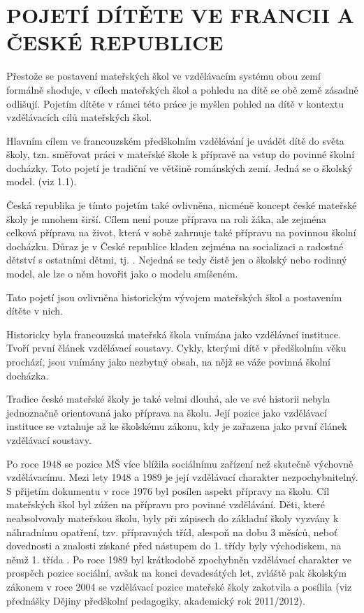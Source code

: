 \chapter{POJETÍ DÍTĚTE VE FRANCII A ČESKÉ REPUBLICE}

Přestože se postavení mateřských škol ve vzdělávacím systému obou zemí formálně shoduje, v cílech mateřských škol a pohledu na dítě se obě země zásadně odlišují. Pojetím dítěte v rámci této práce je myšlen pohled na dítě v kontextu vzdělávacích cílů mateřských škol. 

Hlavním cílem ve francouzském předškolním vzdělávání je uvádět dítě do světa školy, tzn. směřovat práci v mateřské škole k přípravě na vstup do povinné školní docházky. Toto pojetí je tradiční ve většině románských zemí. Jedná se o školský model. (viz 1.1).

 Česká republika je tímto pojetím také ovlivněna, nicméně koncept české mateřské školy je mnohem širší. Cílem není pouze příprava na roli žáka, ale zejména celková příprava na život, která v sobě zahrnuje také přípravu na povinnou školní docházku. Důraz je v České republice kladen zejména na socializaci a radostné dětství s ostatními dětmi, tj. . Nejedná se tedy čistě jen o školský nebo rodinný model, ale lze o něm hovořit jako o modelu smíšeném.

Tato pojetí jsou ovlivněna historickým vývojem mateřských škol a postavením dítěte v nich.

Historicky byla francouzská mateřská škola vnímána jako vzdělávací instituce. Tvoří první článek vzdělávací soustavy. Cykly, kterými dítě v předškolním věku prochází, jsou vnímány jako nezbytný obsah, na nějž se váže povinná školní docházka. 

Tradice české mateřské školy je také velmi dlouhá, ale ve své historii nebyla jednoznačně orientovaná jako příprava na školu. Její pozice jako vzdělávací instituce se vztahuje až ke školskému zákonu, kdy je zařazena jako první článek vzdělávací soustavy. 

 Po roce 1948 se pozice MŠ více blížila sociálnímu zařízení než skutečně výchovně vzdělávacímu. Mezi lety 1948 a 1989 je její vzdělávací charakter nezpochybnitelný. S přijetím dokumentu  v roce 1976 byl posílen aspekt přípravy na školu. Cíl mateřských škol byl zúžen na přípravu pro povinné vzdělávání. Děti, které neabsolvovaly mateřskou školu, byly při zápisech do základní školy vyzvány k náhradnímu opatření, tzv. přípravných tříd, alespoň na dobu 3 měsíců, neboť dovednosti a znalosti získané před nástupem do 1. třídy byly východiskem, na němž 1. třída . Po roce 1989 byl krátkodobě zpochybněn vzdělávací charakter ve prospěch pozice sociální, avšak na konci devadesátých let, zvláště pak školským zákonem v roce 2004 se vzdělávací pozice mateřské školy zakotvila a posílila (viz přednášky Dějiny předškolní pedagogiky, akademický rok 2011/2012).

